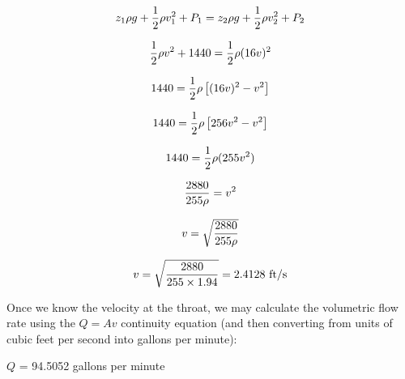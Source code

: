 $$z_1 \rho g + {1 \over 2} \rho v_1^2 + P_1 = z_2 \rho g + {1 \over 2} \rho v_2^2 + P_2$$

$${1 \over 2} \rho v^2 + 1440 = {1 \over 2} \rho (16v)^2$$

$$1440 = {1 \over 2} \rho \left[ (16v)^2 - v^2 \right]$$

$$1440 = {1 \over 2} \rho \left[ 256v^2 - v^2 \right]$$

$$1440 = {1 \over 2} \rho (255v^2)$$

$${2880 \over {255 \rho}} = v^2$$

$$v = \sqrt{{2880 \over {255 \rho}}}$$

$$v = \sqrt{{2880 \over {255 \times 1.94}}} = 2.4128 \hbox{ ft/s}$$

\vskip 10pt

Once we know the velocity at the throat, we may calculate the volumetric flow rate using the $Q = Av$ continuity equation (and then converting from units of cubic feet per second into gallons per minute):

\vskip 10pt

$Q$ = 94.5052 gallons per minute




